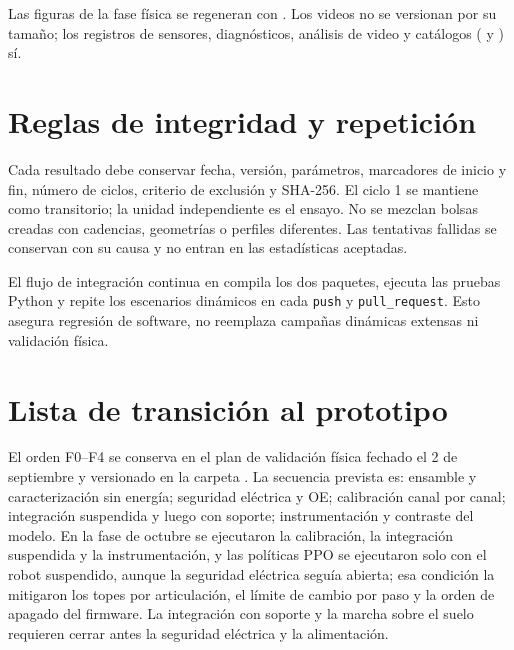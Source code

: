 Las figuras de la fase física se regeneran con
. Los videos no se versionan
por su tamaño; los registros de sensores, diagnósticos, análisis de video y
catálogos ( y ) sí.

\section{Reglas de integridad y repetición}

Cada resultado debe conservar fecha, versión, parámetros, marcadores de inicio
y fin, número de ciclos, criterio de exclusión y SHA-256. El ciclo 1 se mantiene
como transitorio; la unidad independiente es el ensayo. No se mezclan bolsas
creadas con cadencias, geometrías o perfiles diferentes. Las tentativas fallidas
se conservan con su causa y no entran en las estadísticas aceptadas.

El flujo de integración continua en
 compila los dos paquetes,
ejecuta las pruebas Python y repite los escenarios dinámicos en cada
\texttt{push} y \texttt{pull\_request}. Esto asegura regresión de software, no
reemplaza campañas dinámicas extensas ni validación física.

\section{Lista de transición al prototipo}

El orden F0--F4 se conserva en el plan de validación física fechado el 2 de
septiembre y versionado en la carpeta . La
secuencia prevista es: ensamble y caracterización sin energía; seguridad
eléctrica y OE; calibración canal por canal; integración suspendida y luego con
soporte; instrumentación y contraste del modelo. En la fase de octubre se
ejecutaron la calibración, la integración suspendida y la instrumentación, y las
políticas PPO se ejecutaron solo con el robot suspendido, aunque la seguridad
eléctrica seguía abierta; esa condición la mitigaron los topes por
articulación, el límite de cambio por paso y la orden de apagado del firmware.
La integración con soporte y la marcha sobre el suelo requieren cerrar antes la
seguridad eléctrica y la alimentación.
\endgroup
